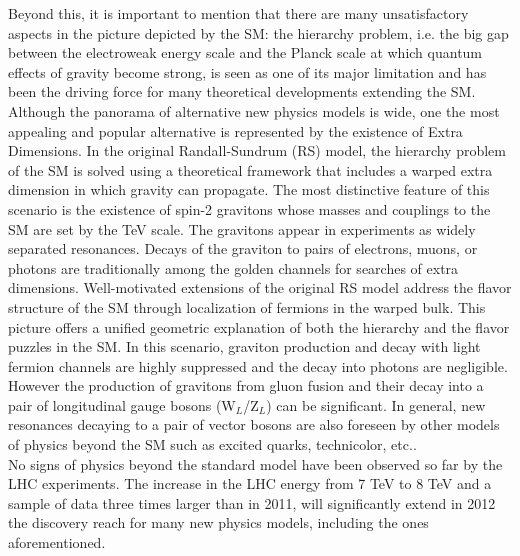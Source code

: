 \documentclass[10pt, a4paper]{article}
\begin{document}
Beyond this, it is important to mention that there are many unsatisfactory 
aspects in the picture depicted by the SM: the hierarchy problem, i.e. the big 
gap between the electroweak energy scale and the Planck scale at which 
quantum effects of gravity become strong, is seen as one of its major limitation 
and has been the driving force for many theoretical developments extending the 
SM. Although the panorama of alternative new physics models is wide, one the 
most appealing and popular alternative is represented by the existence of Extra Dimensions. 
In the original Randall-Sundrum (RS) model, the hierarchy problem
of the SM is solved using a theoretical framework that includes a warped extra dimension
in which gravity can propagate. 
The most distinctive feature of this scenario is the existence of spin-2 gravitons
whose masses and couplings to the SM are set by the TeV scale. The gravitons 
appear in experiments as widely separated resonances. 
Decays of the graviton to pairs of electrons, muons, or photons are traditionally among 
the golden channels for searches of extra dimensions.
Well-motivated extensions of the original RS model address the flavor structure of the SM through 
localization of fermions in the warped bulk. This picture offers a unified geometric explanation 
of both the hierarchy and the flavor puzzles in the SM.
In this scenario, graviton production and decay with light fermion channels are 
highly suppressed and the decay into photons are negligible. 
However the production of gravitons from gluon fusion and 
their decay into a pair of longitudinal gauge bosons (W$_L$/Z$_L$) can be significant.
In general, new resonances decaying to a pair of vector bosons 
are also foreseen by other models of physics beyond the SM such as 
excited quarks, technicolor, etc.. \\
No signs of physics beyond the standard model have been observed so far
by the LHC experiments. The increase in the LHC energy from 7 TeV to 8 TeV 
and a sample of data three times larger than in 2011, 
will significantly extend in 2012 the discovery reach for many new physics models, 
including the ones aforementioned.\\
\end{document}
